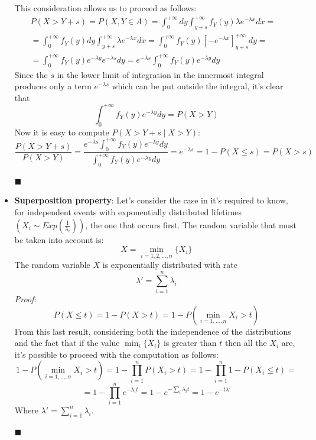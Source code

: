 \documentclass[12pt,a4paper]{article}
\begin{document}
\begin{itemize}
\begin{figure}[H]
\begin{center}
\label{fig:extmemlessarea}
\end{center}
\end{figure}
This consideration allows us to proceed as follows:
\begin{equation*}
\begin{split}
P(X>Y+s) = P(X,Y\in A) = \int_{0}^{+\infty}dy\int_{y+s}^{+\infty}f_Y(y)\lambda e^{-\lambda x}dx= &\\
=\int_{0}^{+\infty}f_Y(y)dy\int_{y+s}^{+\infty}\lambda e^{-\lambda x}dx =\int_{0}^{+\infty}f_Y(y)
\left[-e^{-\lambda x}\right]^{+\infty}_{y+s}dy = &\\
=\int_{0}^{+\infty}f_Y(y)e^{-\lambda y}e^{-\lambda s}dy = e^{-\lambda s}
\int_{0}^{+\infty}f_Y(y)e^{-\lambda y}dy
\end{split}
\end{equation*}
Since the $s$ in the lower limit of integration in the innermost integral produces only a term 
$e^{-\lambda s}$ which can be put outside the integral, it's clear that
$$
\int_{0}^{+\infty}f_Y(y)e^{-\lambda y}dy = P(X>Y)
$$
Now it is easy to compute $P(X>Y+s \mid X>Y)$:
$$
\frac{P(X>Y+s)}{P(X>Y)} = \frac{e^{-\lambda s}\int_{0}^{+\infty}f_Y(y)e^{-\lambda y}dy }
{\int_{0}^{+\infty}f_Y(y)e^{-\lambda y}dy } = e^{-\lambda s} = 1-P(X\leq s) = P(X>s)
$$
\begin{flushright}
$\blacksquare$
\end{flushright}

\item \textbf{Superposition property}:
Let's consider the case in it's required to know, for independent events with exponentially distributed lifetimes $\left( X_i\sim Exp\left(\frac{1}{\lambda_i}\right)\right)$, the one that occurs first. The random variable that must be taken into account is:
$$
X=\min_{i=1,2,\dots,n}{\{X_i\}}
$$ 
The random variable $X$ is exponentially distributed with rate 
$$
\lambda '=\sum_{i=1}^{n}\lambda_i
$$
\emph{Proof:}
$$
P(X\leq t) = 1-P(X>t) = 1-P(\min_{i=1,\dots,n}{X_i}>t)
$$
From this last result, considering both the independence of the distributions and the fact that if the value $\min_i{\{X_i\}}$ is greater than $t$ then all the $X_i$ are, it's possible to proceed with the computation as follows:
$$
1-P(\min_{i=1,\dots,n}{X_i}>t) = 1-\prod_{i=1}^{n}{P(X_i>t)} = 1-\prod_{i=1}^{n}{1-P(X_i\leq t)} =
$$
$$
= 1-\prod_{i=1}^{n}{e^{-\lambda_{i}t}} = 1-e^{-\sum_{i}{\lambda_i t}} = 1-e^{-t\lambda'}
$$
Where $\lambda' = \sum_{i=1}^{n}{\lambda_i}$.
\begin{flushright}
$\blacksquare$
\end{flushright}
\end{itemize}
\end{document}
